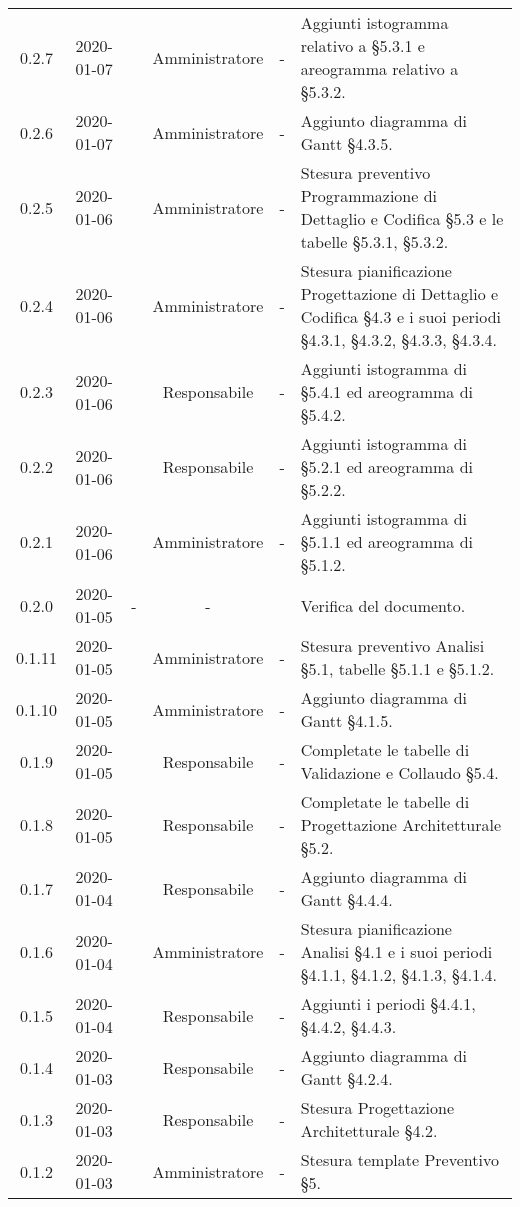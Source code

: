{\begin{longtable}{ c c  C{2.3cm} c C{3cm} C{3.2cm}}
0.2.7 & 2020-01-07 & \LD{} & Amministratore & - & Aggiunti istogramma relativo a §5.3.1 e areogramma relativo a §5.3.2. \\
0.2.6 & 2020-01-07 & \LD{} & Amministratore & - & Aggiunto diagramma di Gantt §4.3.5. \\
0.2.5 & 2020-01-06 & \LD{} & Amministratore & - & Stesura preventivo Programmazione di Dettaglio e Codifica §5.3 e le tabelle §5.3.1, §5.3.2. \\
0.2.4 & 2020-01-06 & \LD{} & Amministratore & - & Stesura pianificazione Progettazione di Dettaglio e Codifica §4.3 e i suoi periodi §4.3.1, §4.3.2, §4.3.3, §4.3.4. \\
0.2.3 & 2020-01-06 & \SE{} & Responsabile & - & Aggiunti istogramma di §5.4.1 ed areogramma di §5.4.2. \\
0.2.2 & 2020-01-06 & \SE{} & Responsabile & - & Aggiunti istogramma di §5.2.1 ed areogramma di §5.2.2. \\
0.2.1 & 2020-01-06 & \LD{} & Amministratore & - & Aggiunti istogramma di §5.1.1 ed areogramma di §5.1.2. \\
0.2.0 & 2020-01-05 & - & - & \MC{} & Verifica del documento. \\
0.1.11 & 2020-01-05 & \LD{} & Amministratore & - & Stesura preventivo Analisi §5.1, tabelle §5.1.1 e §5.1.2. \\
0.1.10 & 2020-01-05 & \LD{} & Amministratore & - & Aggiunto diagramma di Gantt §4.1.5. \\
0.1.9 & 2020-01-05 & \SE{} & Responsabile & - & Completate le tabelle di Validazione e Collaudo §5.4.\\
0.1.8 & 2020-01-05 & \SE{} & Responsabile & - & Completate le tabelle di Progettazione Architetturale §5.2. \\
0.1.7 & 2020-01-04 & \SE{} & Responsabile & - & Aggiunto diagramma di Gantt §4.4.4. \\
0.1.6 & 2020-01-04 & \LD{} & Amministratore & - & Stesura pianificazione Analisi §4.1 e i suoi periodi §4.1.1, §4.1.2, §4.1.3, §4.1.4. \\
0.1.5 & 2020-01-04 & \SE{} & Responsabile & - & Aggiunti i periodi §4.4.1, §4.4.2, §4.4.3. \\
0.1.4 & 2020-01-03 & \SE{} & Responsabile & - & Aggiunto diagramma di Gantt §4.2.4. \\
0.1.3 & 2020-01-03 & \SE{} & Responsabile & - & Stesura Progettazione Architetturale §4.2.\\
0.1.2 & 2020-01-03 & \LD{} & Amministratore & - & Stesura template Preventivo §5. \\

\end{longtable}}
